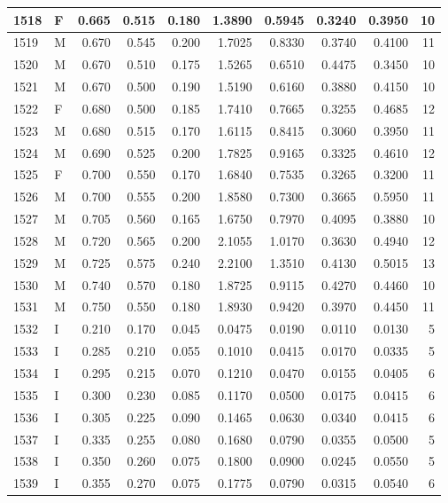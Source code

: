 \documentclass[9pt,twocolumn,twoside,]{pnas-new}
\begin{document}
\begin{tabular}{l|l|r|r|r|r|r|r|r|r}
\hline
1518 & F & 0.665 & 0.515 & 0.180 & 1.3890 & 0.5945 & 0.3240 & 0.3950 & 10\\
\hline
1519 & M & 0.670 & 0.545 & 0.200 & 1.7025 & 0.8330 & 0.3740 & 0.4100 & 11\\
\hline
1520 & M & 0.670 & 0.510 & 0.175 & 1.5265 & 0.6510 & 0.4475 & 0.3450 & 10\\
\hline
1521 & M & 0.670 & 0.500 & 0.190 & 1.5190 & 0.6160 & 0.3880 & 0.4150 & 10\\
\hline
1522 & F & 0.680 & 0.500 & 0.185 & 1.7410 & 0.7665 & 0.3255 & 0.4685 & 12\\
\hline
1523 & M & 0.680 & 0.515 & 0.170 & 1.6115 & 0.8415 & 0.3060 & 0.3950 & 11\\
\hline
1524 & M & 0.690 & 0.525 & 0.200 & 1.7825 & 0.9165 & 0.3325 & 0.4610 & 12\\
\hline
1525 & F & 0.700 & 0.550 & 0.170 & 1.6840 & 0.7535 & 0.3265 & 0.3200 & 11\\
\hline
1526 & M & 0.700 & 0.555 & 0.200 & 1.8580 & 0.7300 & 0.3665 & 0.5950 & 11\\
\hline
1527 & M & 0.705 & 0.560 & 0.165 & 1.6750 & 0.7970 & 0.4095 & 0.3880 & 10\\
\hline
1528 & M & 0.720 & 0.565 & 0.200 & 2.1055 & 1.0170 & 0.3630 & 0.4940 & 12\\
\hline
1529 & M & 0.725 & 0.575 & 0.240 & 2.2100 & 1.3510 & 0.4130 & 0.5015 & 13\\
\hline
1530 & M & 0.740 & 0.570 & 0.180 & 1.8725 & 0.9115 & 0.4270 & 0.4460 & 10\\
\hline
1531 & M & 0.750 & 0.550 & 0.180 & 1.8930 & 0.9420 & 0.3970 & 0.4450 & 11\\
\hline
1532 & I & 0.210 & 0.170 & 0.045 & 0.0475 & 0.0190 & 0.0110 & 0.0130 & 5\\
\hline
1533 & I & 0.285 & 0.210 & 0.055 & 0.1010 & 0.0415 & 0.0170 & 0.0335 & 5\\
\hline
1534 & I & 0.295 & 0.215 & 0.070 & 0.1210 & 0.0470 & 0.0155 & 0.0405 & 6\\
\hline
1535 & I & 0.300 & 0.230 & 0.085 & 0.1170 & 0.0500 & 0.0175 & 0.0415 & 6\\
\hline
1536 & I & 0.305 & 0.225 & 0.090 & 0.1465 & 0.0630 & 0.0340 & 0.0415 & 6\\
\hline
1537 & I & 0.335 & 0.255 & 0.080 & 0.1680 & 0.0790 & 0.0355 & 0.0500 & 5\\
\hline
1538 & I & 0.350 & 0.260 & 0.075 & 0.1800 & 0.0900 & 0.0245 & 0.0550 & 5\\
\hline
1539 & I & 0.355 & 0.270 & 0.075 & 0.1775 & 0.0790 & 0.0315 & 0.0540 & 6\\

\end{tabular}
\end{document}
